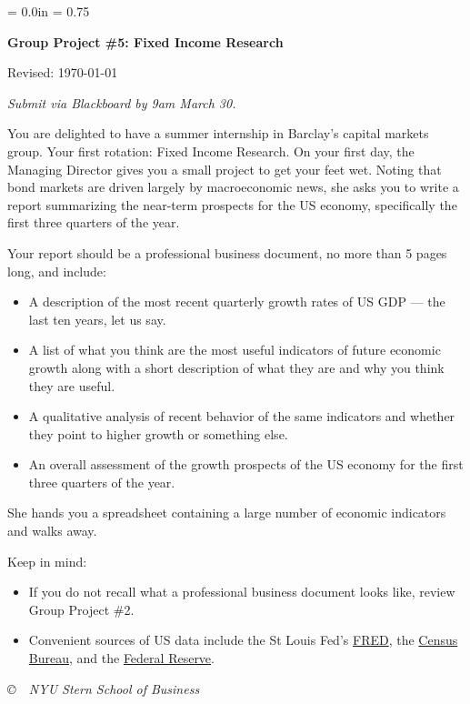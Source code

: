 \documentclass[letterpaper,12pt]{article}
\def\HeadName{Group Project \#5}
\begin{document}
\parindent = 0.0in
\parskip = 0.75\bigskipamount
\thispagestyle{empty}%
\Head

\centerline{\large \bf \HeadName:  Fixed Income Research}%
\centerline{Revised:  \today}

\medskip
{\it Submit via Blackboard by 9am March 30.}
\medskip

You are delighted to have a summer internship in Barclay's  
capital markets group.  
Your first rotation:  Fixed Income Research.  
On your first day, the Managing Director gives you 
a small project to get your feet wet. 
Noting that bond markets are driven largely by macroeconomic news, 
she asks you to write a report summarizing the near-term prospects for the US 
economy, specifically the first three quarters of the year.  

Your report should be a professional business document, no more than 5 pages long, and include:  
%
\begin{itemize}
\item A description of the most recent quarterly growth rates of US GDP 
--- the last ten years, let us say.  

\item A list of what you think are the most useful indicators
of future economic growth 
along with a short description of what they are and why you think they 
are useful.  

\item A qualitative analysis of recent behavior of the same indicators 
and whether they point to higher growth or something else.  

\item An overall assessment of the growth prospects of the US 
 economy for the first three quarters of the year.  
 
\end{itemize}
%
She hands you a spreadsheet containing a large number of 
economic indicators and walks away.  

Keep in mind:  
\begin{itemize} 
\item If you do not recall what a professional business document
looks like, review Group Project \#2.
\item Convenient sources of US data include the St Louis Fed's 
\href{http://research.stlouisfed.org/fred2/}{FRED}, 
the \href{http://www.census.gov/briefrm/staticindipage.html}
{Census Bureau}, 
and the 
\href{http://www.federalreserve.gov/econresdata/releases/statisticsdata.htm}
{Federal Reserve}.
\end{itemize} 


\vfill \centerline{\it \copyright \ \number\year \ 
NYU Stern School of Business}
\end{document}
